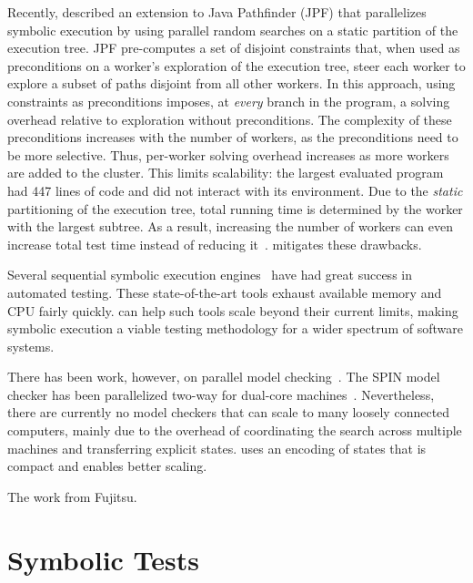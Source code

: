 Recently, \cite{parallelSymbex} described an extension to Java Pathfinder (JPF) that parallelizes symbolic execution by using parallel random searches on a static partition of the execution tree.  JPF pre-computes a set of disjoint constraints that, when used as preconditions on a worker's exploration of the execution tree, steer each worker to explore a subset of paths disjoint from all other workers.  In this approach, using constraints as preconditions imposes, at {\em every} branch in the program, a solving overhead relative to exploration without preconditions.  The complexity of these preconditions increases with the number of workers, as the preconditions need to be more selective.  Thus, per-worker solving overhead increases as more workers are added to the cluster.  This limits scalability: the largest evaluated program had 447 lines of code and did not interact with its environment.  Due to the {\em static} partitioning of the execution tree, total running time is determined by the worker with the largest subtree.  As a result, increasing the number of workers can even increase total test time instead of reducing it~\cite{parallelSymbex}.  \cnine mitigates these drawbacks.

Several sequential symbolic execution engines~\cite{godefroid:fuzz,dart,hct,klee} have had great success in automated testing. These state-of-the-art tools exhaust available memory and CPU fairly quickly.  \cnine can help such tools scale beyond their current limits, making symbolic execution a viable testing methodology for a wider spectrum of software systems.

There has been work, however, on parallel model checking~\cite{parallelMurphi,distributed-spin,loadBalModelchecking,spin:multicore-modelchecking,modelCheckBDD}. The SPIN model checker has been parallelized two-way for dual-core machines~\cite{parallelSPIN}. Nevertheless, there are currently no model checkers that can scale to many loosely connected computers, mainly due to the overhead of coordinating the search across multiple machines and transferring explicit states. \cnine uses an encoding of states that is compact and enables better scaling.

The work from Fujitsu.


\section{Symbolic Tests}

